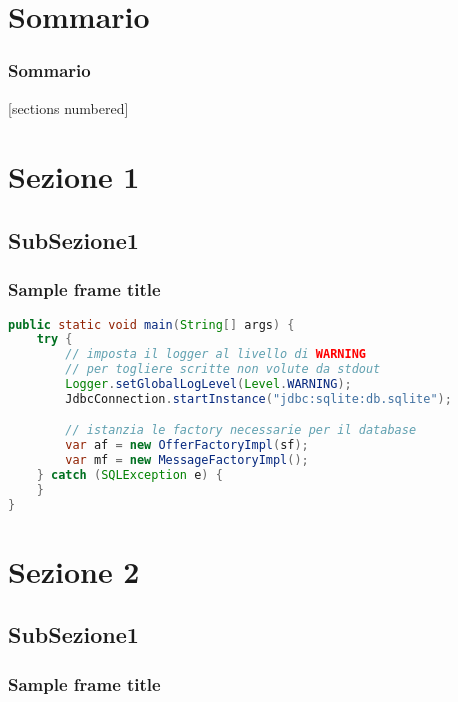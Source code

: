 \begin{frame}[plain]
    \maketitle
\end{frame}

\section{Sommario}
\begin{frame}[allowframebreaks]
    \frametitle{Sommario}
    [sections numbered]
    \tableofcontents

\end{frame}

\section{Sezione 1}
\subsection{SubSezione1}
\begin{frame}[fragile]
    \frametitle{Sample frame title}
    \lstset{style=java}
    \begin{lstlisting}[language=java]
public static void main(String[] args) {
    try {
        // imposta il logger al livello di WARNING 
        // per togliere scritte non volute da stdout
        Logger.setGlobalLogLevel(Level.WARNING);
        JdbcConnection.startInstance("jdbc:sqlite:db.sqlite");

        // istanzia le factory necessarie per il database
        var af = new OfferFactoryImpl(sf);
        var mf = new MessageFactoryImpl();
    } catch (SQLException e) {
    }
}
    \end{lstlisting}
\end{frame}

\section{Sezione 2}
\subsection{SubSezione1}
\begin{frame}
    \frametitle{Sample frame title}
\end{frame}

